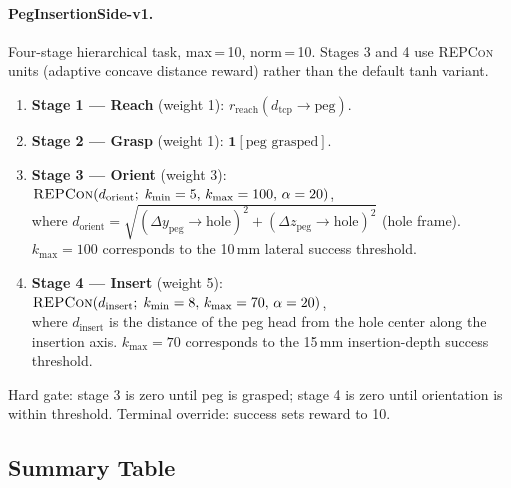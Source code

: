 \documentclass{article}
\begin{document}
\paragraph{PegInsertionSide-v1.}
Four-stage hierarchical task, max\,=\,10, norm\,=\,10.
Stages 3 and 4 use \textsc{REPCon} units (adaptive concave distance reward) rather than
the default tanh variant.
\begin{enumerate}
  \item \textbf{Stage 1 --- Reach} (weight 1): $r_\text{reach}(d_\text{tcp}{\to}\text{peg})$.
  \item \textbf{Stage 2 --- Grasp} (weight 1): $\mathbf{1}[\text{peg grasped}]$.
  \item \textbf{Stage 3 --- Orient} (weight 3):
    $\textsc{REPCon}(d_\text{orient};\; k_\text{min}=5,\, k_\text{max}=100,\, \alpha=20)$,\\
    where $d_\text{orient} = \sqrt{(\Delta y_\text{peg}{\to}\text{hole})^2 + (\Delta z_\text{peg}{\to}\text{hole})^2}$ (hole frame).
    $k_\text{max}=100$ corresponds to the 10\,mm lateral success threshold.
  \item \textbf{Stage 4 --- Insert} (weight 5):
    $\textsc{REPCon}(d_\text{insert};\; k_\text{min}=8,\, k_\text{max}=70,\, \alpha=20)$,\\
    where $d_\text{insert}$ is the distance of the peg head from the hole center along the insertion axis.
    $k_\text{max}=70$ corresponds to the 15\,mm insertion-depth success threshold.
\end{enumerate}
Hard gate: stage 3 is zero until peg is grasped; stage 4 is zero until orientation is within threshold.
Terminal override: success sets reward to 10.

\subsection*{Summary Table}
\end{document}
